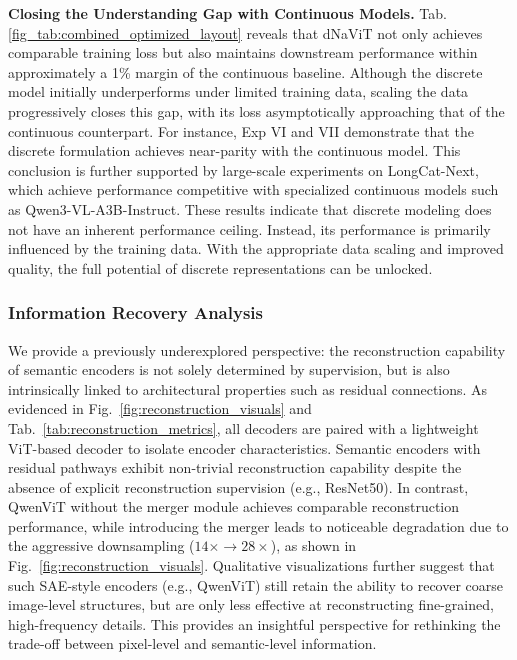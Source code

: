 \textbf{Closing the Understanding Gap with Continuous Models.} Tab. \ref{fig_tab:combined_optimized_layout} reveals that dNaViT not only achieves comparable training loss but also maintains downstream performance within approximately a 1\% margin of the continuous baseline. Although the discrete model initially underperforms under limited training data, scaling the data progressively closes this gap, with its loss asymptotically approaching that of the continuous counterpart. For instance, Exp VI and VII demonstrate that the discrete formulation achieves near-parity with the continuous model. This conclusion is further supported by large-scale experiments on LongCat-Next, which achieve performance competitive with specialized continuous models such as Qwen3-VL-A3B-Instruct. These results indicate that discrete modeling does not have an inherent performance ceiling. Instead, its performance is primarily influenced by the training data. With the appropriate data scaling and improved quality, the full potential of discrete representations can be unlocked.



\subsubsection{Information Recovery Analysis} 
\label{information_recovery}



We provide a previously underexplored perspective: the reconstruction capability of semantic encoders is not solely determined by supervision, but is also intrinsically linked to architectural properties such as residual connections. As evidenced in Fig.~\ref{fig:reconstruction_visuals} and Tab.~\ref{tab:reconstruction_metrics}, all decoders are paired with a lightweight ViT-based decoder to isolate encoder characteristics. Semantic encoders with residual pathways exhibit non-trivial reconstruction capability despite the absence of explicit reconstruction supervision (e.g., ResNet50). In contrast, QwenViT without the merger module achieves comparable reconstruction performance, while introducing the merger leads to noticeable degradation due to the aggressive downsampling ($14\times \rightarrow 28\times$), as shown in Fig.~\ref{fig:reconstruction_visuals}. Qualitative visualizations further suggest that such SAE-style encoders (e.g., QwenViT) still retain the ability to recover coarse image-level structures, but are only less effective at reconstructing fine-grained, high-frequency details. This provides an insightful perspective for rethinking the trade-off between pixel-level and semantic-level information.


